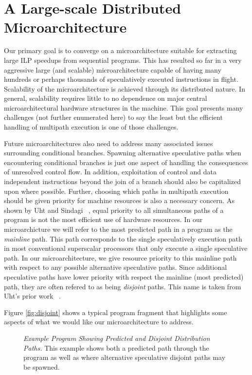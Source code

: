 \documentclass[10pt,dvips]{article}
\begin{document}
\section{A Large-scale Distributed Microarchitecture}
%
Our primary goal is to converge on a microarchitecture suitable
for extracting large ILP speedups from sequential programs.
This has resulted so far in a very aggressive large (and scalable)
microarchitecture capable of having many hundreds or perhaps thousands
of speculatively executed instructions in flight.  Scalability
of the microarchitecture is achieved through its distributed nature.
In general, scalability requires little to no dependence on major
central microarchitectural hardware structures in the machine.
This goal presents many challenges (not further enumerated here)
to say the least but the efficient handling of multipath execution
is one of those challenges.  

Future microarchitectures also need to 
address many associated issues surrounding conditional branches.
Spawning alternative speculative paths when encountering conditional
branches is just one aspect of handling the consequences of
unresolved control flow.
In addition, exploitation
of control
and data independent instructions beyond the join of a branch should
also be capitalized upon where possible.
Further, choosing which paths in multipath execution should
be given priority for machine resources is also a necessary concern.
As shown by Uht and Sindagi ~\cite{Uht95},
equal priority to all simultaneous paths
of a program is not the most efficient use of hardware resources.
In our microarchicture we will refer to the most predicted path
in a program as the 
\textit{mainline} path.  
This path corresponds to the single speculatively
execution path in most conventional superscalar processors that only
execute a single speculative path.  In our microarchitecture,
we give resource priority to this mainline path with respect
to any possible alternative speculative paths.  
Since additional speculative paths have lower priority with
respect the mainline (most predicted) path, they are often refered
to as being
\textit{disjoint} paths.  
This name is taken from Uht's 
prior work ~\cite{Uht95}.

Figure \ref{fig:disjoint} shows a typical program fragment that
highlights some aspects of what we would like our microarchitecture
to address.

\begin{figure}
\centering
{}
\caption{{\em Example Program Showing Predicted and Disjoint Distribution 
Paths.} 
This example shows both a predicted path through the program as
well as where alternative speculative disjoint paths may be
spawned.}
\label{fig:benches}
\end{figure}
\end{document}
